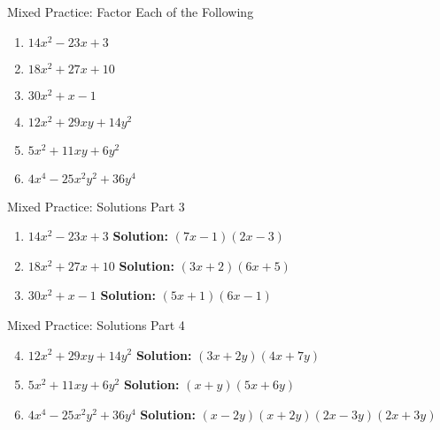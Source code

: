 \documentclass[aspectratio=169]{beamer}
\begin{document}
\begin{frame}{Mixed Practice: Factor Each of the Following}
    \begin{tcolorbox}[colback=lightgray,colframe=primary,title=Factor Each of the Following]
        \footnotesize
        \begin{enumerate}
            \setlength{\itemsep}{0.5em}
            \item $14x^2 - 23x + 3$
            \item $18x^2 + 27x + 10$
            \item $30x^2 + x - 1$
            \item $12x^2 + 29xy + 14y^2$
            \item $5x^2 + 11xy + 6y^2$
            \item $4x^4 - 25x^2y^2 + 36y^4$
        \end{enumerate}
    \end{tcolorbox}
\end{frame}

\begin{frame}{Mixed Practice: Solutions Part 3}
    \begin{tcolorbox}[colback=lightgray,colframe=accent,title=Detailed Solutions]
        \footnotesize
        \begin{enumerate}
            \setlength{\itemsep}{0.5em}
            \item $14x^2 - 23x + 3$
            \quad \textbf{Solution:} $(7x - 1)(2x - 3)$
            \item $18x^2 + 27x + 10$
            \quad \textbf{Solution:} $(3x + 2)(6x + 5)$
            \item $30x^2 + x - 1$
            \quad \textbf{Solution:} $(5x + 1)(6x - 1)$
        \end{enumerate}
    \end{tcolorbox}
\end{frame}

\begin{frame}{Mixed Practice: Solutions Part 4}
    \begin{tcolorbox}[colback=lightgray,colframe=accent,title=Detailed Solutions]
        \footnotesize
        \begin{enumerate}
            \setcounter{enumi}{3}
            \setlength{\itemsep}{0.5em}
            \item $12x^2 + 29xy + 14y^2$
            \quad \textbf{Solution:} $(3x + 2y)(4x + 7y)$
            \item $5x^2 + 11xy + 6y^2$
            \quad \textbf{Solution:} $(x + y)(5x + 6y)$
            \item $4x^4 - 25x^2y^2 + 36y^4$
            \quad \textbf{Solution:} $(x-2y)(x+2y)(2x-3y)(2x+3y)$
        \end{enumerate}
    \end{tcolorbox}
\end{frame}
\end{document}
